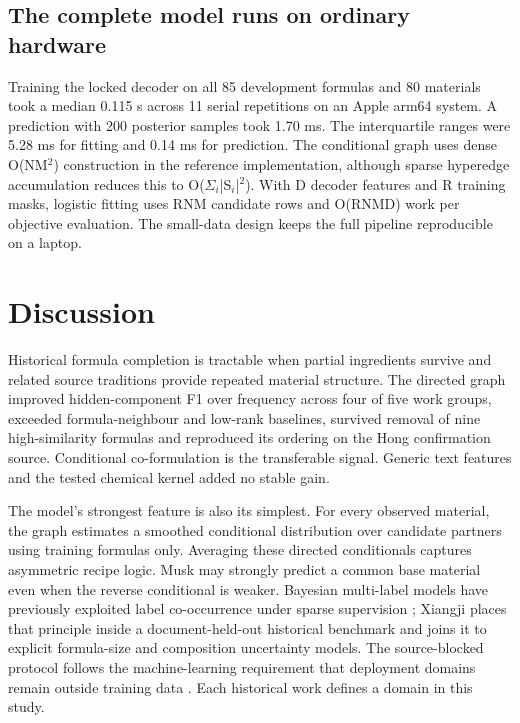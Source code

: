 \documentclass[11pt]{article}
\begin{document}
\subsection{The complete model runs on ordinary hardware}

Training the locked decoder on all 85 development formulas and 80 materials took a median 0.115 s across 11 serial repetitions on an Apple arm64 system. A prediction with 200 posterior samples took 1.70 ms. The interquartile ranges were 5.28 ms for fitting and 0.14 ms for prediction. The conditional graph uses dense O(NM\ensuremath{{}^{2}}) construction in the reference implementation, although sparse hyperedge accumulation reduces this to O(\ensuremath{\Sigma}\ensuremath{_{i}}|S\ensuremath{_{i}}|\ensuremath{{}^{2}}). With D decoder features and R training masks, logistic fitting uses RNM candidate rows and O(RNMD) work per objective evaluation. The small-data design keeps the full pipeline reproducible on a laptop.

\section{Discussion}

Historical formula completion is tractable when partial ingredients survive and related source traditions provide repeated material structure. The directed graph improved hidden-component F1 over frequency across four of five work groups, exceeded formula-neighbour and low-rank baselines, survived removal of nine high-similarity formulas and reproduced its ordering on the Hong confirmation source. Conditional co-formulation is the transferable signal. Generic text features and the tested chemical kernel added no stable gain.

The model's strongest feature is also its simplest. For every observed material, the graph estimates a smoothed conditional distribution over candidate partners using training formulas only. Averaging these directed conditionals captures asymmetric recipe logic. Musk may strongly predict a common base material even when the reverse conditional is weaker. Bayesian multi-label models have previously exploited label co-occurrence under sparse supervision \cite{ref13}; Xiangji places that principle inside a document-held-out historical benchmark and joins it to explicit formula-size and composition uncertainty models. The source-blocked protocol follows the machine-learning requirement that deployment domains remain outside training data \cite{ref14}. Each historical work defines a domain in this study.
\end{document}
